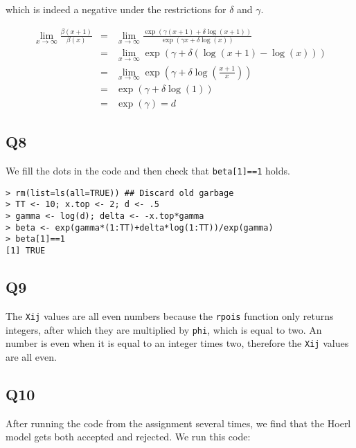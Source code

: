 \documentclass[11pt]{article}
\begin{document}
which is indeed a negative under the restrictions for $\delta$ and $\gamma$.

\begin{eqnarray}
\lim_{x \to \infty} \frac{\beta(x+1)}{\beta(x)} &=& \lim_{x \to \infty} \frac{\exp(\gamma (x+1) + \delta \log(x+1))}{\exp(\gamma x + \delta \log(x))} \\
&=& \lim_{x \to \infty}  \exp(\gamma + \delta(\log(x+1) - \log(x))) \\
&=& \lim_{x \to \infty}  \exp(\gamma + \delta\log\left(\frac{x+1}{x}\right)) \\
&=&\exp(\gamma + \delta\log\left(1\right)) \\
&=&\exp(\gamma) = d
\end{eqnarray}

\subsection*{Q8}

We fill the dots in the code and then check that \verb|beta[1]==1| holds.

\begin{verbatim}
> rm(list=ls(all=TRUE)) ## Discard old garbage
> TT <- 10; x.top <- 2; d <- .5
> gamma <- log(d); delta <- -x.top*gamma
> beta <- exp(gamma*(1:TT)+delta*log(1:TT))/exp(gamma)
> beta[1]==1
[1] TRUE
\end{verbatim}

\subsection*{Q9}

The \verb|Xij| values are all even numbers because the \verb|rpois| function only returns integers, after which they are multiplied by \verb|phi|, which is equal to two. An number is even when it is equal to an integer times two, therefore the \verb|Xij| values are all even.

\subsection*{Q10}

After running the code from the assignment several times, we find that the Hoerl model gets both accepted and rejected. We run this code:
\end{document}
